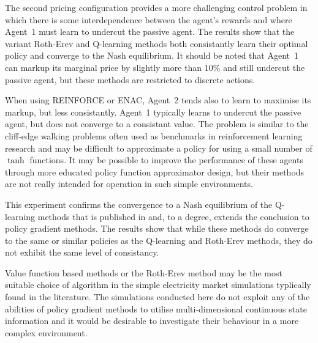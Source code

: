 The second pricing configuration provides a more challenging control problem in
which there is some interdependence between the agent's rewards and where
Agent~1 must learn to undercut the passive agent.  The results show that the
variant Roth-Erev and Q-learning methods both consistantly learn their optimal
policy and converge to the Nash equilibrium.  It should be noted that Agent~1
can markup its marginal price by slightly more than 10\% and still undercut
the passive agent, but these methods are restricted to discrete actions.

When using REINFORCE or ENAC, Agent~2 tends also to learn to maximise its
markup, but less consistantly.  Agent~1 typically learns to undercut the
passive agent, but does not converge to a consistant value.  The problem is
similar to the cliff-edge walking problems often used as benchmarks in
reinforcement learning research and may be difficult to approximate a policy
for using a small number of $\tanh$ functions. It may be possible to improve
the performance of these agents through more educated policy function
approximator design, but their methods are not really intended for operation in
such simple environments.

This experiment confirms the convergence to a Nash equilibrium of the
Q-learning methods that is published in  and, to a degree,
extends the conclusion to policy gradient methods.  The results show that
while these methods do converge to the same or similar policies as the
Q-learning and Roth-Erev methods, they do not exhibit the same level of
consistancy.

Value function based methods or the Roth-Erev method may be the
most suitable choice of algorithm in the simple electricity market simulations
typlically found in the literature.  The simulations conducted here do not
exploit any of the abilities of policy gradient methods to utilise
multi-dimensional continuous state information and it would be desirable to
investigate their behaviour in a more complex environment.



